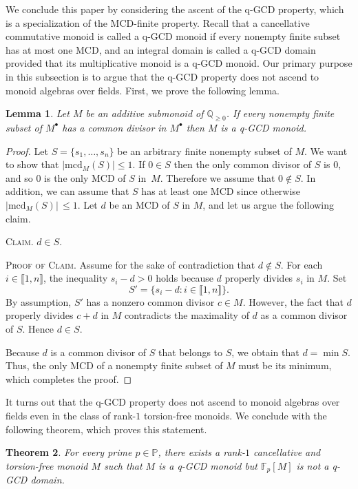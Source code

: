 \documentclass[10pt]{amsart}
\newtheorem{theorem}{Theorem}[section]
\newtheorem{lemma}[theorem]{Lemma}
\theoremstyle{definition}
\theoremstyle{remark}
\numberwithin{equation}{section}
\newcommand{\ff}{\mathbb{F}}
\newcommand{\pp}{\mathbb{P}}
\newcommand{\qq}{\mathbb{Q}}
\newcommand{\mcd}{\mathrm{mcd}}
\providecommand\ldb{\llbracket}
\providecommand\rdb{\rrbracket}
\begin{document}
We conclude this paper by considering the ascent of the q-GCD property, which is a specialization of the MCD-finite property. Recall that a cancellative commutative monoid is called a q-GCD monoid if every nonempty finite subset has at most one MCD, and an integral domain is called a q-GCD domain provided that its multiplicative monoid is a q-GCD monoid. Our primary purpose in this subsection is to argue that the q-GCD property does not ascend to monoid algebras over fields. First, we prove the following lemma.

\begin{lemma} \label{lem:CD Puiseux monoids are q-GCD}
  Let $M$ be an additive submonoid of $\qq_{\ge 0}$. If every nonempty finite subset of $M^\bullet$ has a common divisor in $M^\bullet$ then $M$ is a q-GCD monoid.
\end{lemma}

\begin{proof}
  Let $S = \{s_1, \dots, s_n\}$ be an arbitrary finite nonempty subset of $M$. We want to show that $|\mcd_M(S)| \le 1$. If $0 \in S$ then the only common divisor of $S$ is $0$, and so $0$ is the only MCD of $S$ in~$M$. Therefore we assume that $0 \notin S$. In addition, we can assume that $S$ has at least one MCD since otherwise $|\mcd_M(S)| \, \le 1$. Let $d$ be an MCD of $S$ in $M$, and let us argue the following claim.
  \smallskip

  \noindent \textsc{Claim.} $d \in S$.
  \smallskip

  \noindent \textsc{Proof of Claim.} Assume for the sake of contradiction that $d \notin S$. For each $i \in \ldb 1, n \rdb$, the inequality $s_i - d > 0$ holds because $d$ properly divides $s_i$ in $M$. Set
  \[
    S' = \big\{ s_i - d : i \in \ldb 1, n \rdb \big\}.
  \]
  By assumption, $S'$ has a nonzero common divisor $c \in M$. However, the fact that $d$ properly divides $c+d$ in $M$ contradicts the maximality of $d$ as a common divisor of $S$. Hence $d \in S$.
  \smallskip

  Because $d$ is a common divisor of $S$ that belongs to $S$, we obtain that $d = \min S$. Thus, the only MCD of a nonempty finite subset of $M$ must be its minimum, which completes the proof.
\end{proof}

It turns out that the q-GCD property does not ascend to monoid algebras over fields even in the class of rank-$1$ torsion-free monoids. We conclude with the following theorem, which proves this statement.

\begin{theorem}
  For every prime $p \in \pp$, there exists a rank-$1$ cancellative and torsion-free monoid $M$ such that $M$ is a q-GCD monoid but $\ff_p[M]$ is not a q-GCD domain.
\end{theorem}
\end{document}
